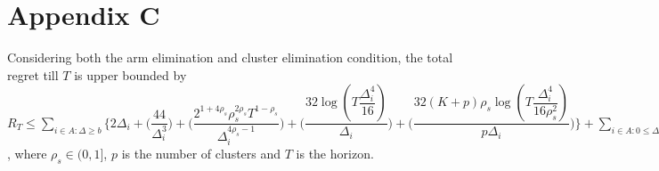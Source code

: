 \section{Appendix C}

\begin{theorem}
Considering both the arm elimination and cluster elimination condition, the total regret till $T$ is upper bounded by $R_{T}\leq \sum_{i\in A:\Delta\geq b} \bigg\lbrace 2\Delta_{i}+ \bigg(\dfrac{44}{\Delta_{i}^{3}}\bigg) + \bigg(\dfrac{2^{1+4\rho_{s}}\rho_{s}^{2\rho_{s}}T^{1-\rho_{s}}}{\Delta_{i}^{4\rho_{s}-1}}\bigg) + \bigg(\dfrac{32\log{(T\dfrac{\Delta_{i}^{4}}{16})}}{\Delta_{i}}\bigg) + \bigg(\dfrac{32(K+p)\rho_{s}\log{(T\dfrac{\Delta_{i}^{4}}{16\rho_{s}^{2}})}}{p\Delta_{i}}\bigg)\bigg\rbrace + \sum_{i\in A:0\leq\Delta_{i}\leq b}\bigg\lbrace \bigg(\dfrac{12}{b^{3}} \bigg) + \bigg(\dfrac{T^{1-\rho_{s}}2^{2\rho_{s}+\frac{3}{2}}}{\Delta_{i}^{3}} \bigg)+\bigg(\dfrac{T^{1-\rho_{s}}2^{2\rho_{s}+\frac{3}{2}}}{b^{4\rho_{s} -1}} \bigg) \bigg\rbrace + max_{i:\Delta\leq b}\Delta_{i}T $, where $\rho_{s}\in (0,1]$, $p$ is the number of clusters and $T$ is the horizon.
\end{theorem}

